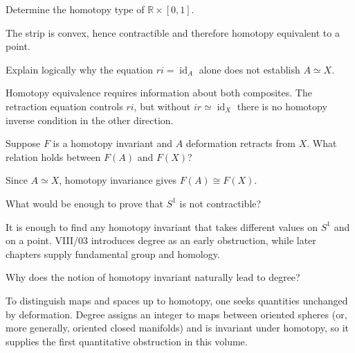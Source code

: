 \begin{problem}\label{prob:viii02-08}
Determine the homotopy type of \(\mathbb R\times[0,1]\).
\end{problem}
\begin{solution}
The strip is convex, hence contractible and therefore homotopy equivalent to a point.
\end{solution}

\begin{problem}\label{prob:viii02-09}
Explain logically why the equation \(ri=\operatorname{id}_A\) alone does not
establish \(A\simeq X\).
\end{problem}
\begin{solution}
Homotopy equivalence requires information about both composites.  The retraction
equation controls \(ri\), but without \(ir\simeq\operatorname{id}_X\) there is
no homotopy inverse condition in the other direction.
\end{solution}

\begin{problem}\label{prob:viii02-10}
Suppose \(F\) is a homotopy invariant and \(A\) deformation retracts from \(X\).
What relation holds between \(F(A)\) and \(F(X)\)?
\end{problem}
\begin{solution}
Since \(A\simeq X\), homotopy invariance gives \(F(A)\cong F(X)\).
\end{solution}

\begin{problem}\label{prob:viii02-11}
What would be enough to prove that \(S^1\) is not contractible?
\end{problem}
\begin{solution}
It is enough to find any homotopy invariant that takes different values on
\(S^1\) and on a point.  VIII/03 introduces degree as an early obstruction,
while later chapters supply fundamental group and homology.
\end{solution}

\begin{problem}\label{prob:viii02-12}
Why does the notion of homotopy invariant naturally lead to degree?
\end{problem}
\begin{solution}
To distinguish maps and spaces up to homotopy, one seeks quantities unchanged
by deformation.  Degree assigns an integer to maps between oriented spheres
(or, more generally, oriented closed manifolds) and is invariant under homotopy,
so it supplies the first quantitative obstruction in this volume.
\end{solution}
